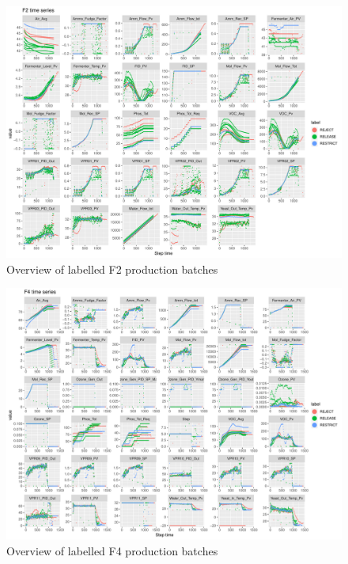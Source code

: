 \documentclass{article}
\begin{document}
\begin{figure}[ht]
    \centering
    \includegraphics[width=1.1\textwidth]{f2_plot}
    \caption{Overview of labelled F2 production batches}
    \label{fig:f2series}
\end{figure}

\begin{figure}[ht]
    \centering
    \includegraphics[width=1.1\textwidth]{f4_plot}
    \caption{Overview of labelled F4 production batches}
    \label{fig:f4series}
\end{figure}
\end{document}
